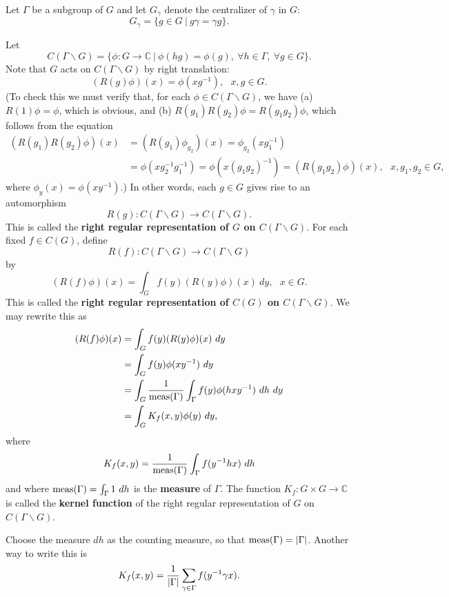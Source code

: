 \documentclass[12pt]{article}
\def\ccc{\mathbb{C}}
\begin{document}
Let $\Gamma $ be a subgroup of $G$ and let
$G_\gamma$ denote the centralizer of $\gamma$ in $G$:
\[
G_\gamma = \{g\in G\ |\ g\gamma = \gamma g\}.
\]

Let
\[
C(\Gamma \backslash G)=\{\phi:G\rightarrow \ccc\ |\ \phi(hg)=\phi(g),
\ \forall h\in \Gamma ,\ \forall g\in G\}.
\]
Note that $G$ acts on $C(\Gamma \backslash G)$ by right translation:
\[
(R(g)\phi)(x)=\phi(xg^{-1}),\ \ \ x,g\in G.
\]
(To check this we must verify that, for each $\phi\in 
C(\Gamma \backslash G)$, we have (a) $R(1)\phi=\phi$, 
which is obvious, and (b) $R(g_1)R(g_2)\phi=R(g_1g_2)\phi$,
which follows from the equation
\[
\begin{split}
(R(g_1)R(g_2)\phi)(x)
&=(R(g_1)\phi_{g_2})(x)=\phi_{g_2}(xg_1^{-1})\\
&=\phi(xg_2^{-1}g_1^{-1})=\phi(x(g_1g_2)^{-1})=(R(g_1g_2)\phi)(x),
\ \ \ x,g_1,g_2\in G,
\end{split}
\]
where $\phi_y(x)=\phi(xy^{-1})$.) In other words, each
$g\in G$ gives rise to an automorphism
\[
R(g): C(\Gamma \backslash G)\rightarrow C(\Gamma \backslash G).
\]
This is called the {\bf right regular representation
of $G$ on $C(\Gamma \backslash G)$}.
For each fixed $f \in C(G)$, define
\[
R(f): C(\Gamma \backslash G)\rightarrow C(\Gamma \backslash G)
\]
by
\[
(R(f)\phi)(x)=\int_G f(y)(R(y)\phi)(x)\ dy,\ \ \ x\in G.
\]
This is called the {\bf right regular representation
of $C(G)$ on $C(\Gamma \backslash G)$}. We may rewrite this as
\begin{equation}
\label{eq:rt_reg}
\begin{split}
(R(f)\phi)(x)
&=\int_G f(y)(R(y)\phi)(x)\ dy\\
&=\int_G f(y)\phi(xy^{-1})\ dy\\
&=\int_G {1\over {\rm meas}(\Gamma )}\int_\Gamma  f(y)\phi(hxy^{-1})\ dh\ dy\\
&=\int_G K_f(x,y)\phi(y)\ dy,
\end{split}
\end{equation}
where
\[
K_f(x,y)={1\over {\rm meas}(\Gamma )}\int_\Gamma  f(y^{-1}hx)\ dh
\]
and where ${\rm meas}(\Gamma )=\int_\Gamma  1\ dh$ is the {\bf measure}
of $\Gamma $. The function $K_f:G\times G\rightarrow \ccc$
is called the {\bf kernel function} of the right regular representation
of $G$ on $C(\Gamma \backslash G)$. 

Choose the measure $dh$ as the counting measure,
so that ${\rm meas}(\Gamma )=|\Gamma |$. Another way to write this is
\[
K_f(x,y)={1\over |\Gamma |}\sum_{\gamma \in \Gamma } f(y^{-1}\gamma x).
\]
\end{document}
